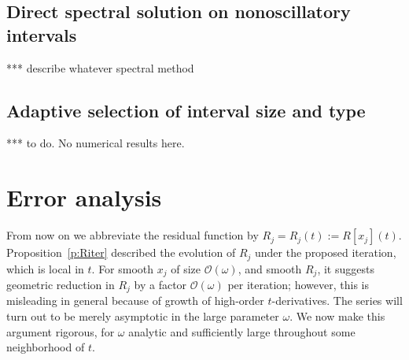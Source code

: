 \documentclass[10pt]{article}
\newcommand{\bigO}{{\mathcal O}}
\newcommand{\om}{\omega}
\begin{document}
\subsection{Direct spectral solution on nonoscillatory intervals}

*** describe whatever spectral method

\subsection{Adaptive selection of interval size and type}

*** to do. No numerical results here.


\section{Error analysis}

From now on we abbreviate the residual function by $R_j = R_j(t) := R[x_j](t)$.
Proposition~\ref{p:Riter} described the evolution of $R_j$
under the proposed iteration, which is local in $t$.
For smooth $x_j$ of size $\bigO(\om)$, and smooth $R_j$,
it suggests geometric reduction in $R_j$ by a factor $\bigO(\om)$ per iteration;
however, this is misleading in general because of
growth of high-order $t$-derivatives.
The series will turn out to be merely asymptotic in the large parameter $\om$.
We now make this argument rigorous, for $\om$ analytic
and sufficiently large throughout some neighborhood of $t$.

\end{document}
